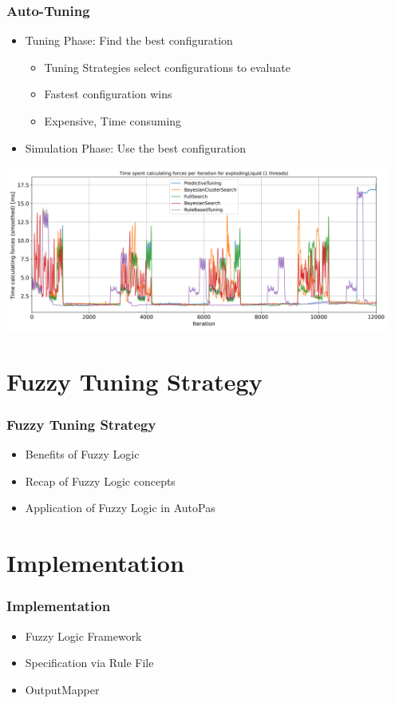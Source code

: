 \documentclass[
	10pt,
	t		%
]{beamer}
\begin{document}
\begin{frame}
	\frametitle{Auto-Tuning }

	\begin{itemize}
		\item Tuning Phase: Find the best configuration
		      \begin{itemize}
			      \item Tuning Strategies select configurations to evaluate
			      \item Fastest configuration wins
			      \item Expensive, Time consuming
		      \end{itemize}
		\item Simulation Phase: Use the best configuration
	\end{itemize}

	\vspace{0.2cm}

	\begin{center}
		\includegraphics[width=0.95\textwidth,trim={0 0 0 0.85cm},clip]{figures/timing_explodingLiquid.png}
	\end{center}


\end{frame}


\section{Fuzzy Tuning Strategy}
\begin{frame}
	\frametitle{Fuzzy Tuning Strategy}
	\begin{itemize}
		\item Benefits of Fuzzy Logic
		\item Recap of Fuzzy Logic concepts
		\item Application of Fuzzy Logic in AutoPas
	\end{itemize}
\end{frame}

\section{Implementation}
\begin{frame}
	\frametitle{Implementation}
	\begin{itemize}
		\item Fuzzy Logic Framework
		\item Specification via Rule File
		\item OutputMapper
	\end{itemize}
\end{frame}
\end{document}
